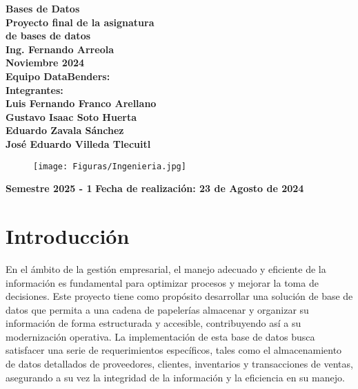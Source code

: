 \documentclass[10pt,openany]{book}
\begin{document}
\begin{titlepage}
\begin{minipage}[t]{0.75\textwidth}
\begin{center}
\textbf{\huge {Bases de Datos}}\\[6mm]
\textbf{\LARGE {Proyecto final de la asignatura\\ de bases de datos}}\\[10mm]
\textbf{\LARGE {Ing. Fernando Arreola}}\\[10mm]
\textbf{\LARGE {Noviembre 2024}}\\[10mm]
\textbf{\LARGE {Equipo DataBenders:}}\\[6mm]
\textbf{\LARGE {Integrantes:}}\\[6mm]
\textbf{\LARGE {Luis Fernando Franco Arellano}}\\
\textbf{\LARGE {Gustavo Isaac Soto Huerta}}\\
\textbf{\LARGE {Eduardo Zavala Sánchez}}\\
\textbf{\LARGE {José Eduardo Villeda Tlecuitl}}
\end{center}
\end{minipage}
\noindent
\begin{minipage}[T]{0.25\textwidth}%
\begin{figure}[H]
\texttt{[image: Figuras/Ingenieria.jpg]}
\end{figure}
\end{minipage}\hfill\begin{minipage}[c]{0.75\textwidth}%
\vspace{2cm}
\textbf{Semestre 2025 - 1} \hfill \textbf{Fecha de realización: 23 de Agosto de 2024}
\end{minipage}
\end{titlepage}

\pagebreak


\chapter{Introducción}

En el ámbito de la gestión empresarial, el manejo adecuado y eficiente de la información es fundamental para optimizar procesos y mejorar la toma de decisiones. Este proyecto tiene como propósito desarrollar una solución de base de datos que permita a una cadena de papelerías almacenar y organizar su información de forma estructurada y accesible, contribuyendo así a su modernización operativa. La implementación de esta base de datos busca satisfacer una serie de requerimientos específicos, tales como el almacenamiento de datos detallados de proveedores, clientes, inventarios y transacciones de ventas, asegurando a su vez la integridad de la información y la eficiencia en su manejo.
\end{document}
